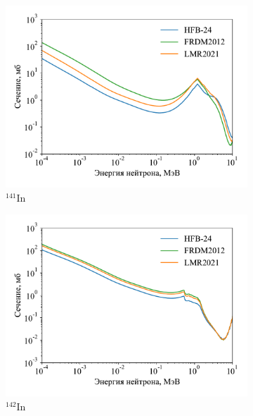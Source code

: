 \begin{figure}
  \centering
  \begin{subfigure}{0.48\textwidth}
    \centering
    \includegraphics[width=\textwidth]{pics/cs_in141.pdf}
    \caption{${}^{141}$In}
  \end{subfigure}
  \hfill
  \begin{subfigure}{0.48\textwidth}
    \centering
    \includegraphics[width=\textwidth]{pics/cs_in142.pdf}
    \caption{${}^{142}$In}
  \end{subfigure}
  \\
  \begin{subfigure}{0.48\textwidth}
    \centering

\end{subfigure}
\end{figure}

